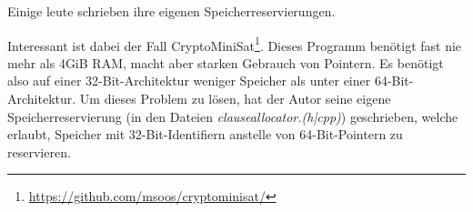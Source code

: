 
Einige leute schrieben ihre eigenen Speicherreservierungen.

Interessant ist dabei der Fall CryptoMiniSat\footnote{\url{https://github.com/msoos/cryptominisat/}}.
Dieses Programm benötigt fast nie mehr als 4GiB \ac{RAM}, macht aber starken Gebrauch von Pointern.
Es benötigt also auf einer 32-Bit-Architektur weniger Speicher als unter einer 64-Bit-Architektur.
Um dieses Problem zu lösen, hat der Autor seine eigene Speicherreservierung (in den Dateien
\emph{clauseallocator.(h|cpp)}) geschrieben, welche erlaubt, Speicher mit 32-Bit-Identifiern anstelle von 64-Bit-Pointern
zu reservieren.

